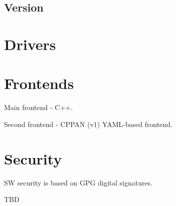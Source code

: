\subsection{Version}


\section{Drivers}

\section{Frontends}

Main frontend - C++.

Second frontend - CPPAN (v1) YAML-based frontend.


\section{Security}

SW security is based on GPG digital signatures.

TBD


